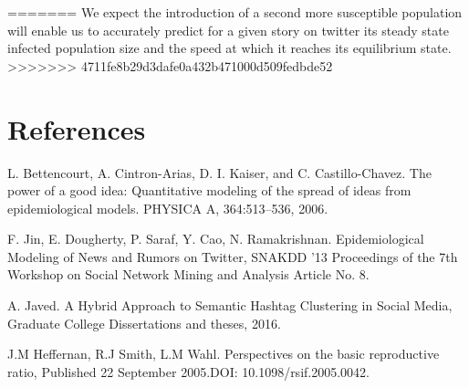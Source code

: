 \documentclass{article}
\begin{document}
=======
We expect the introduction of a second more susceptible population will enable us to accurately predict for a given story on twitter its steady state infected population size and the speed at which it reaches its equilibrium state. 
>>>>>>> 4711fe8b29d3dafe0a432b471000d509fedbde52
\section{References}
\begin{enumerate}[label={[\arabic*]}]
\item  L. Bettencourt, A. Cintron-Arias, D. I. Kaiser, and C. Castillo-Chavez. The power of a good idea: Quantitative modeling of the spread of ideas from epidemiological models. PHYSICA A, 364:513–536, 2006.
\item F. Jin, E. Dougherty, P. Saraf, Y. Cao, N. Ramakrishnan. Epidemiological Modeling of News and Rumors on Twitter, SNAKDD '13 Proceedings of the 7th Workshop on Social Network Mining and Analysis
Article No. 8.
\item A. Javed. A Hybrid Approach to Semantic Hashtag Clustering in Social Media, Graduate College Dissertations and  theses, 2016.
\item J.M Heffernan, R.J Smith, L.M Wahl. Perspectives on the basic reproductive ratio, Published 22 September 2005.DOI: 10.1098/rsif.2005.0042.
\end{enumerate}
\end{document}
